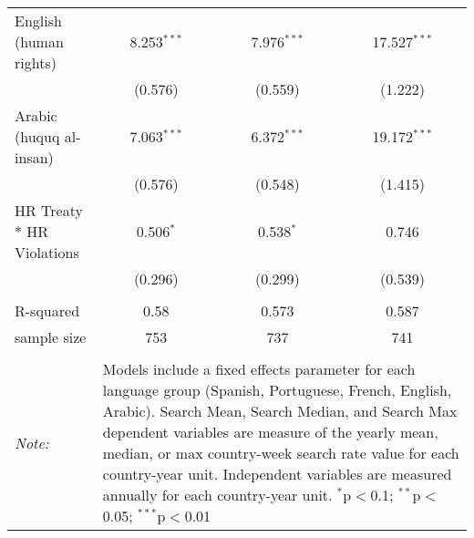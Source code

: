 \begin{table}[!htbp]
\begin{tabular}{@{\extracolsep{5pt}}lccc}
  English (human rights) & 8.253$^{***}$ & 7.976$^{***}$ & 17.527$^{***}$ \\ 
  & (0.576) & (0.559) & (1.222) \\ 
  Arabic (huquq al-insan) & 7.063$^{***}$ & 6.372$^{***}$ & 19.172$^{***}$ \\ 
  & (0.576) & (0.548) & (1.415) \\ 
  HR Treaty * HR Violations & 0.506$^{*}$ & 0.538$^{*}$ & 0.746 \\ 
  & (0.296) & (0.299) & (0.539) \\ 
 \hline \\[-1.8ex] 
R-squared  & 0.58 & 0.573 & 0.587 \\ 
sample size  & 753 & 737 & 741 \\ 
\hline 
\hline \\[-1.8ex] 
\textit{Note:}  & \multicolumn{3}{l}{\parbox[t]{8cm}{Models include a fixed effects parameter for each language group (Spanish, Portuguese, French, English, Arabic). Search Mean, Search Median, and Search Max dependent variables are measure of the yearly mean, median, or max country-week search rate value for each country-year unit. Independent variables are measured annually for each country-year unit. $^{*}$p$<$0.1; $^{**}$p$<$0.05; $^{***}$p$<$0.01}} \\ 
\end{tabular} 
\end{table} 
